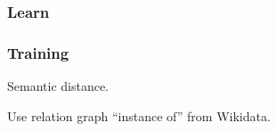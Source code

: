 \subsubsection{Learn}

\begin{frame}
\frametitle{Training}
Semantic distance.

Use relation graph ``instance of'' from Wikidata.
\end{frame} 
